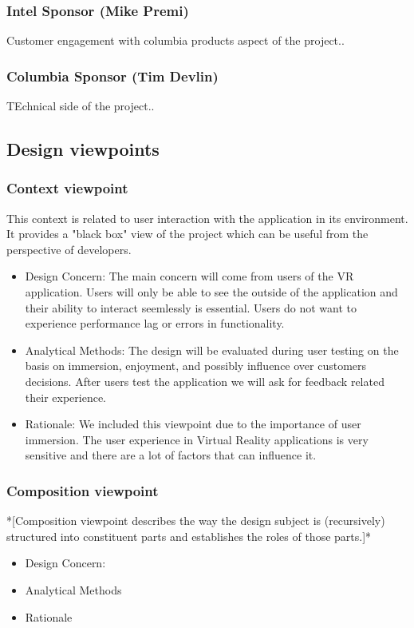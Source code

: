 \documentclass[10pt,journal,compsoc,onecolumn, draftclsnofoot]{IEEEtran}
\begin{document}
\subsubsection{Intel Sponsor (Mike Premi)}
Customer engagement with columbia products aspect of the project..
\subsubsection{Columbia Sponsor (Tim Devlin)}
TEchnical side of the project..

\subsection{Design viewpoints}
\subsubsection{Context viewpoint}
This context is related to user interaction with the application in its environment. It provides a "black box" view of the project which can be useful from the perspective of developers.
\begin{itemize}
  \item Design Concern: The main concern will come from users of the VR application. Users will only be able to see the outside of the application and their ability to interact seemlessly is essential. Users do not want to experience performance lag or errors in functionality.
  \item Analytical Methods: The design will be evaluated during user testing on the basis on immersion, enjoyment, and possibly influence over customers decisions. After users test the application we will ask for feedback related their experience.
  \item Rationale: We included this viewpoint due to the importance of user immersion. The user experience in Virtual Reality applications is very sensitive and there are a lot of factors that can influence it.
\end{itemize}
\subsubsection{Composition viewpoint}
*[Composition viewpoint describes the way the design subject is (recursively) structured into constituent parts and establishes the roles of those parts.]*
\begin{itemize}
  \item Design Concern:
  \item Analytical Methods
  \item Rationale
\end{itemize}
\end{document}
